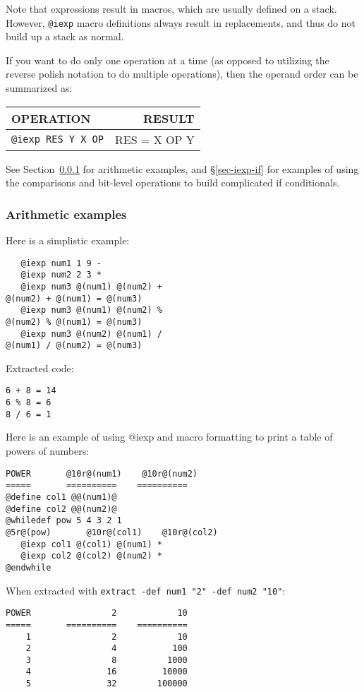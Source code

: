 Note that expressions result in macros, which are usually defined on a stack.  
However, {\tt @iexp} macro definitions always result in replacements, and
thus do not build up a stack as normal.

If you want to do only one operation at a time (as opposed to utilizing the
reverse polish notation to do multiple operations), then the operand
order can be summarized as:

\begin{tabular}{||l|r||}\hline\hline
   OPERATION   & RESULT \\\hline
{\tt @iexp RES Y X OP} & RES = X OP Y \\\hline\hline
\end{tabular}

See Section~\ref{sec-iexp-arith} for arithmetic examples, and 
\S\ref{sec-iexp-if} for examples of using the comparisons and bit-level
operations to build complicated if conditionals.

\subsubsection{Arithmetic examples}
\label{sec-iexp-arith}
{\samepage
\noindent
Here is a simplistic example:
\begin{verbatim}
   @iexp num1 1 9 -
   @iexp num2 2 3 *
   @iexp num3 @(num1) @(num2) +
@(num2) + @(num1) = @(num3)
   @iexp num3 @(num1) @(num2) %
@(num2) % @(num1) = @(num3)
   @iexp num3 @(num2) @(num1) /
@(num1) / @(num2) = @(num3)
\end{verbatim}
}

{\samepage
\noindent
Extracted code:
\begin{verbatim}
6 + 8 = 14
6 % 8 = 6
8 / 6 = 1
\end{verbatim}
}

Here is an example of using @iexp and macro formatting to print a table of
powers of numbers:

\begin{verbatim}
POWER       @10r@(num1)    @10r@(num2)
=====       ==========    ==========
@define col1 @@(num1)@
@define col2 @@(num2)@
@whiledef pow 5 4 3 2 1
@5r@(pow)       @10r@(col1)    @10r@(col2)
   @iexp col1 @(col1) @(num1) *
   @iexp col2 @(col2) @(num2) *
@endwhile
\end{verbatim}

\noindent
When extracted with {\tt extract -def num1 "2" -def num2 "10"}:
\begin{verbatim}
POWER                2            10
=====       ==========    ==========
    1                2            10
    2                4           100
    3                8          1000
    4               16         10000
    5               32        100000
\end{verbatim}


